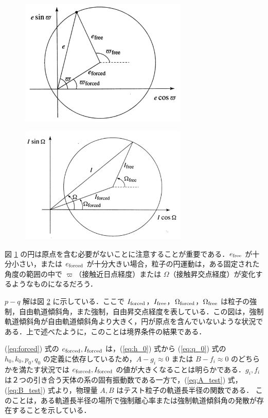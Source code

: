 \documentclass[11pt,a4paper,oneside,onecolumn]{jreport}
\begin{document}
\begin{figure}[H]
\centering
\includegraphics[width=8cm]{./image/sec7_2.pdf}
\caption{\label{fig:geometrical_e}}
\end{figure}

\begin{figure}[H]
\centering
\includegraphics[width=8cm]{./image/sec7_3.pdf}
\caption{\label{fig:geometrical_I}}
\end{figure}

図 \ref{fig:geometrical_e} の円は原点を含む必要がないことに注意することが重要である．$e_{\rm free}$ が十分小さい，または $e_{\rm forced}$ が十分大きい場合，粒子の円運動は，ある固定された角度の範囲の中で $\varpi$（接触近日点経度）または $\Omega$（接触昇交点経度）が変化するようなものになるだろう．

$p - q$ 解は図 \ref{fig:geometrical_I} に示している．ここで $I_{\rm forced}$，$I_{\rm free}$，$\Omega_{\rm forced}$，$\Omega_{\rm free}$ は粒子の強制，自由軌道傾斜角，また強制，自由昇交点経度を表している．この図は，強制軌道傾斜角が自由軌道傾斜角より大きく，円が原点を含んでいないような状況である．上で述べたように，このことは境界条件の結果である．

(\ref{eq:forced}) 式の $e_{\rm forced}, I_{\rm forced}$ は，(\ref{eq:h_0}) 式から (\ref{eq:q_0}) 式の $h_0, k_0, p_0, q_0$ の定義に依存しているため，$A - g_i \approx 0$ または $B - f_i \approx 0$ のどちらかを満たす状況では $e_{\rm forced}, I_{\rm forced}$ の値が大きくなることは明らかである．$g_i, f_i$ は２つの引き合う天体の系の固有振動数である一方で，(\ref{eq:A_test}) 式，(\ref{eq:B_test}) 式より，物理量 $A, B$ はテスト粒子の軌道長半径の関数である． このことは，ある軌道長半径の場所で強制離心率または強制軌道傾斜角の発散が存在することを示している．
\end{document}
